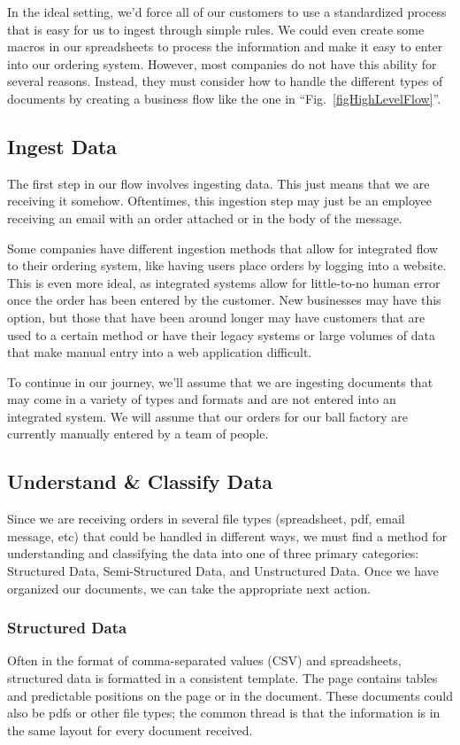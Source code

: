 \documentclass[conference]{IEEEtran}
\begin{document}
In the ideal setting, we'd force all of our customers to use a standardized process that is easy for us to ingest through simple rules. We could even create some macros in our spreadsheets to process the information and make it easy to enter into our ordering system. However, most companies do not have this ability for several reasons. Instead, they must consider how to handle the different types of documents by creating a business flow like the one in ``Fig.~\ref{figHighLevelFlow}''.

\subsection{Ingest Data}
The first step in our flow involves ingesting data. This just means that we are receiving it somehow. Oftentimes, this ingestion step may just be an employee receiving an email with an order attached or in the body of the message.

Some companies have different ingestion methods that allow for integrated flow to their ordering system, like having users place orders by logging into a website. This is even more ideal, as integrated systems allow for little-to-no human error once the order has been entered by the customer. New businesses may have this option, but those that have been around longer may have customers that are used to a certain method or have their legacy systems or large volumes of data that make manual entry into a web application difficult.

To continue in our journey, we'll assume that we are ingesting documents that may come in a variety of types and formats and are not entered into an integrated system. We will assume that our orders for our ball factory are currently manually entered by a team of people.

\subsection{Understand \& Classify Data}
Since we are receiving orders in several file types (spreadsheet, pdf, email message, etc) that could be handled in different ways, we must find a method for understanding and classifying the data into one of three primary categories: Structured Data, Semi-Structured Data, and Unstructured Data. Once we have organized our documents, we can take the appropriate next action.

\subsubsection{Structured Data}
Often in the format of comma-separated values (CSV) and spreadsheets, structured data is formatted in a consistent template. The page contains tables and predictable positions on the page or in the document. These documents could also be pdfs or other file types; the common thread is that the information is in the same layout for every document received.
\end{document}
